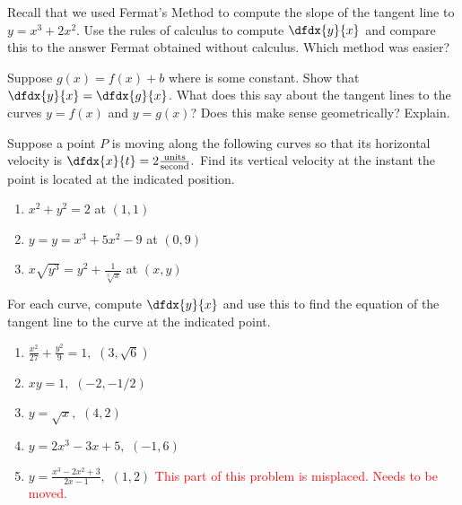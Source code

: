 \begin{ProblemSection}

    \begin{embeddedproblem}{}
    Recall that we used Fermat's Method to compute the slope of the
    tangent line to $y= {x} ^ {3} +2 {x} ^ {2}$.  Use the rules of
    calculus to compute $\dfdx{y}{x}$  and compare
    this to the answer Fermat obtained without calculus.  Which method
    was easier? 
  \end{embeddedproblem}

  \begin{embeddedproblem}{}
    Suppose $g \left (x \right ) =f \left (x \right ) +b$ where is
    some constant.  Show that $\dfdx{y}{x}=\dfdx{g}{x}$.  What does
    this say about the tangent lines to the curves $y=f(x)$ and
    $y=g(x)$?  Does this make sense geometrically?  Explain.
  \end{embeddedproblem}

    \begin{embeddedproblem}{}
    Suppose a point $P$ is moving along the following curves so that
    its horizontal velocity is
    $\dfdx{x}{t}= 2\frac{\text{units}}{\text{second}}.$ Find its
    vertical velocity at the instant the point is located at the
    indicated position.
    \begin{enumerate}[label={\bf{}(\alph*)}]
    \item $x^2+y^2=2$ at $(1,1)$
    \item $y=y= {x} ^ {3} +5 {x} ^ {2} -9 $ at $(0,9)$
    \item $x\sqrt{y^3}=y^2+\frac{1}{\sqrt[3]{x}}$ at $(x,y)$
    \end{enumerate}
  \end{embeddedproblem}
  \begin{embeddedproblem}{}
    For each curve, compute $\dfdx{y}{x}$ and use this to find the equation of
    the tangent line to the curve at the indicated point.
    \begin{enumerate}[label={\bf{}(\alph*)}]
    \item  $ \frac{x^2}{27}+\frac{y^2}{9}=1,$ $ (3,\sqrt{6})$
    \item  $    xy=1,$ $(-2,-1/2)$
    \item  $    y=\sqrt{x},$ $ (4,2)$
    \item  $    y=2x^3-3x+5,$ $ (-1,6)$
    \item  $    y=\frac{x^3-2x^2+3}{2x-1},$ $ (1,2)$
      \textcolor{red}{This part of this problem is misplaced. Needs to be moved.}
    \end{enumerate}
  \end{embeddedproblem}





\end{ProblemSection}
